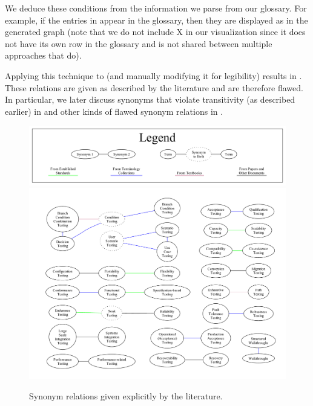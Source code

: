 \ifnotpaper
    
    We deduce these conditions from the information we parse from our
    glossary. For example, if the entries in 
    appear in the glossary, then they are displayed as 
    in the generated graph (note that we do not include X in our visualization
    since it does not have its own row in the glossary and is not shared
    between multiple approaches that do).

    Applying this technique to \ourApproachGlossary{} (and manually modifying
    it for legibility) results in . These relations are
    given as described by the literature and are therefore flawed. In
    particular, we later discuss synonyms that violate transitivity (as
    described earlier) in  and other kinds of flawed synonym
    relations in .

    \begin{figure}[tb!]
        \centering
        \includegraphics[width=\textwidth]{assets/graphs/manual/expSynLegend.pdf}
        \includegraphics[width=\textwidth]{assets/graphs/manual/expSynGraph.pdf}
        \caption{Synonym relations given explicitly by the literature.}
        \label{fig:expSynGraph}
    \end{figure}

